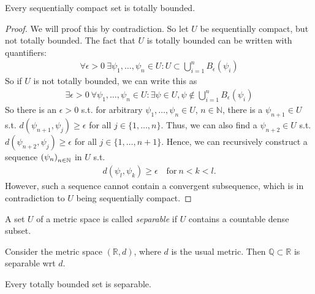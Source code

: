 \begin{theorem}\label{thrm:seq_compact_set_tot_bound}
	Every sequentially compact set is totally bounded.
\end{theorem}

\begin{proof}
	We will proof this by contradiction. So let $U$ be sequentially compact, but not totally bounded. The fact that $U$ is totally bounded can be written with quantifiers:
	\begin{align*}
		\forall \epsilon > 0\ \exists \psi_1, \dots, \psi_n\in U: U\subset \bigcup_{i=1}^{n}B_{\epsilon}(\psi_i)
	\end{align*}
	So if $U$ is not totally bounded, we can write this as 
	\begin{align*}
		\exists\epsilon > 0\ \forall \psi_1, \dots, \psi_n\in U:\exists \psi\in U, \psi\notin\bigcup_{i = 1}^{n}B_{\epsilon}(\psi_i)
	\end{align*}		
	So there is an $\epsilon > 0$ s.t. for arbitrary $\psi_1, \dots, \psi_n\in U$, $n\in\mathbb N$, there is a $\psi_{n+1}\in U$ s.t. $d(\psi_{n+1}, \psi_j) \geq \epsilon$ for all $j\in\{1, \dots, n\}$. Thus, we can also find a $\psi_{n+2}\in U$ s.t. $d(\psi_{n+2}, \psi_j) \geq \epsilon$ for all $j\in \{1, \dots, n+1\}$. Hence, we can recursively construct a sequence $\seq[\psi_n]$ in $U$ s.t.
	\begin{align*}
		d(\psi_l, \psi_k) \geq\epsilon\quad \text{for}\ n < k < l.
	\end{align*}
	However, such a sequence cannot contain a convergent subsequence, which is in contradiction to $U$ being sequentially compact.
\end{proof}

\begin{defn}
	A set $U$ of a metric space is called \textit{separable} if $U$ contains a countable dense subset.
\end{defn}

\begin{exmp}
	Consider the metric space $(\mathbb R, d)$, where $d$ is the usual metric. Then $\mathbb Q\subset\mathbb R$ is separable wrt $d$.
\end{exmp}

\begin{theorem}\label{thrm:totally_bounded_set_separable}
	Every totally bounded set is separable.
\end{theorem}

